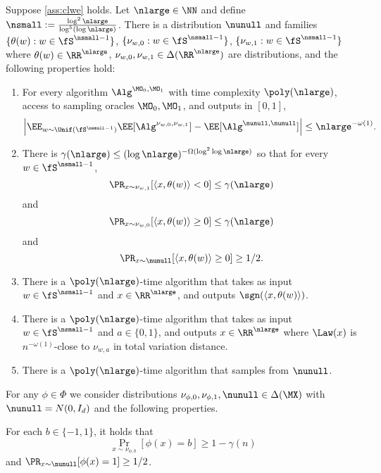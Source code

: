 \begin{theorem}\label{thm:ltf-distributions}
Suppose \cref{ass:clwe} holds. Let $\nlarge \in\NN$ and define $\nsmall := \frac{\log^2 \nlarge}{\log^5(\log \nlarge)}$. There is a distribution $\nunull$ and families $\{\theta(w): w \in \fS^{\nsmall-1}\}$, $\{\nu_{w,0}:w \in \fS^{\nsmall-1}\}$, $\{\nu_{w,1}: w \in \fS^{\nsmall-1}\}$ where $\theta(w) \in \RR^{\nlarge}$, $\nu_{w,0},\nu_{w,1} \in \Delta(\RR^{\nlarge})$ are distributions, and the following properties hold:
\begin{enumerate}
\item\label{item:no-adv} For every algorithm $\Alg^{\MO_0,\MO_1}$ with time complexity $\poly(\nlarge)$, access to sampling oracles $\MO_0,\MO_1$, and outputs in $[0,1]$,
\[\left|\EE_{w \sim \Unif(\fS^{\nsmall-1})} \EE[\Alg^{\nu_{w,0},\nu_{w,1}}] - \EE[\Alg^{\nunull,\nunull}]\right| \leq \nlarge^{-\omega(1)}.\]
\item\label{item:class-error-bounds} There is $\gamma(\nlarge) \leq (\log \nlarge)^{-\Omega(\log^2 \log \nlarge)}$ so that for every $w \in \fS^{\nsmall-1}$,
\[\Pr_{x \sim \nu_{w,1}}[\langle x, \theta(w) \rangle < 0] \leq \gamma(\nlarge)\]
and
\[\Pr_{x \sim \nu_{w,0}}[\langle x,\theta(w) \rangle \geq 0] \leq \gamma(\nlarge)\]
and
\[\Pr_{x\sim\nunull}[\langle x,\theta(w)\rangle \geq 0] \geq 1/2.\]

\item\label{item:eval-halfspace} There is a $\poly(\nlarge)$-time algorithm that takes as input $w \in \fS^{\nsmall-1}$ and $x \in \RR^{\nlarge}$, and outputs $\sgn(\langle x,\theta(w)\rangle)$.

\item\label{item:nu-samp} There is a $\poly(\nlarge)$-time algorithm that takes as input $w \in \fS^{\nsmall-1}$ and $a \in \{0,1\}$, and outputs $x \in \RR^{\nlarge}$ where $\Law(x)$ is $n^{-\omega(1)}$-close to $\nu_{w,a}$ in total variation distance.
\item\label{item:null-samp} There is a $\poly(\nlarge)$-time algorithm that samples from $\nunull$.
\end{enumerate}
\end{theorem}


\iffalse
{}

For any $\phi \in \Phi$ we consider distributions $\nu_{\phi,0},\nu_{\phi,1},\nunull \in \Delta(\MX)$ with $\nunull = N(0,I_d)$ and the following properties.

\begin{assumption}
For each $b \in \{-1,1\}$, it holds that
\[\Pr_{x \sim \nu_{\phi,b}}[\phi(x) = b] \geq 1 - \gamma(n)\]
and $\Pr_{x\sim\nunull}[\phi(x)=1] \geq 1/2$. 
\end{assumption}

